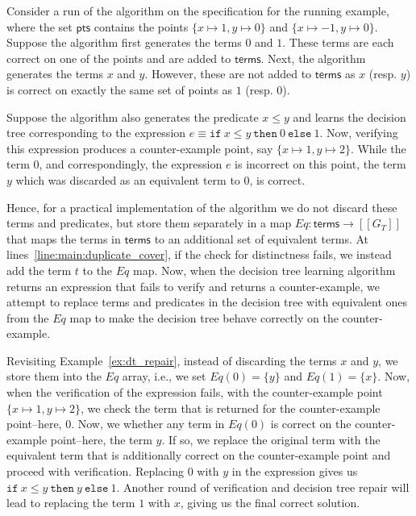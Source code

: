 \documentclass{llncs}
\newcommand\Equiv{\mathit{Eq}}
\newcommand\Points{\mathsf{pts}}
\newcommand\Expr{e}
\newcommand\Terms{\mathsf{terms}}
\newcommand\Term{t}
\newcommand\Grammar{G}
\newcommand\sem[1]{[\![ #1 ]\!]}
\begin{document}
\begin{example}
  \label{ex:dt_repair}
  Consider a run of the algorithm on the specification for the running
  example, where the set $\Points$ contains the points $\{ x \mapsto 1,
  y \mapsto 0 \}$ and $\{ x \mapsto -1, y \mapsto 0 \}$.
  Suppose the algorithm first generates the terms $0$ and $1$.
  These terms are each correct on one of the points and are added to
  $\Terms$.
  Next, the algorithm generates the terms $x$ and $y$.
  However, these are not added to $\Terms$ as $x$ (resp. $y$) is correct
  on exactly the same set of points as $1$ (resp. $0$).

  Suppose the algorithm also generates the predicate $x \leq y$ and
  learns the decision tree corresponding to the expression $\Expr \equiv
  \mathtt{if}~x \leq y~\mathtt{then}~0~\mathtt{else}~1$.
  Now, verifying this expression produces a counter-example point, say
  $\{ x \mapsto 1, y \mapsto 2 \}$.
  While the term $0$, and correspondingly, the expression $\Expr$ is
  incorrect on this point, the term $y$ which was discarded as an
  equivalent term to $0$, is correct.
\end{example}

Hence, for a practical implementation of the algorithm we do not discard
these terms and predicates, but store them separately in a map $\Equiv :
\Terms \to \sem{\Grammar_T}$ that maps the terms in
$\Terms$ to an additional set of equivalent terms.
At lines~\ref{line:main:duplicate_cover}, if the check for distinctness
fails, we instead add the term $\Term$ to the $\Equiv$ map.
Now, when the decision tree learning algorithm returns an expression
that fails to verify and returns a counter-example, we attempt to
replace terms and predicates in the decision tree with equivalent ones
from the $\Equiv$ map to make the decision tree behave correctly on the
counter-example.

\begin{example}
  Revisiting Example~\ref{ex:dt_repair}, instead of discarding the terms
  $x$ and $y$, we store them into the $\Equiv$ array, i.e., we set
  $\Equiv(0) = \{ y \}$ and $\Equiv(1) = \{ x \}$.
  Now, when the verification of the expression fails, with the
  counter-example point $\{ x \mapsto 1, y \mapsto 2 \}$, we check the
  term that is returned for the counter-example point--here, $0$.
  Now, we whether any term in $\Equiv(0)$ is correct on the
  counter-example point--here, the term $y$.
  If so, we replace the original term with the equivalent term that is
  additionally correct on the counter-example point and proceed with
  verification.
  Replacing $0$ with $y$ in the expression gives us $\mathtt{if}~x \leq
  y~\mathtt{then}~y~\mathtt{else}~1$.
  Another round of verification and decision tree repair will lead to
  replacing the term $1$ with $x$, giving us the final correct solution.
\end{example}
\end{document}
